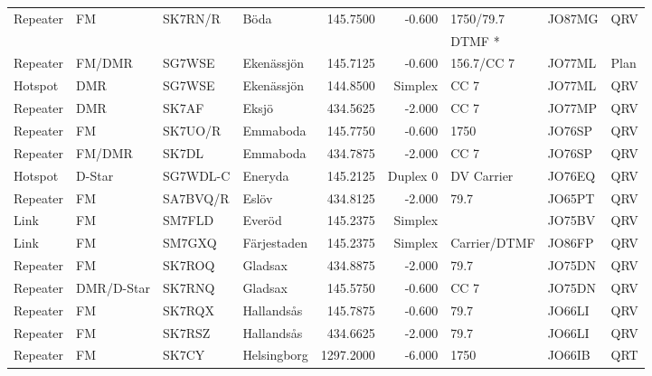 \begin{landscape}
\begin{longtable}{llllrrlll}
Repeater & FM              & SK7RN/R  & Böda         & 145.7500     & -0.600     & 1750/79.7    & JO87MG      & QRV      \\
         &                 &          &              &              &            & DTMF *       &             &          \\
Repeater & FM/DMR          & SG7WSE   & Ekenässjön   & 145.7125     & -0.600     & 156.7/CC 7   & JO77ML      & Plan     \\
Hotspot  & DMR             & SG7WSE   & Ekenässjön   & 144.8500     & Simplex    & CC 7         & JO77ML      & QRV      \\
Repeater & DMR             & SK7AF    & Eksjö        & 434.5625     & -2.000     & CC 7         & JO77MP      & QRV      \\
Repeater & FM              & SK7UO/R  & Emmaboda     & 145.7750     & -0.600     & 1750         & JO76SP      & QRV      \\
Repeater & FM/DMR          & SK7DL    & Emmaboda     & 434.7875     & -2.000     & CC 7         & JO76SP      & QRV      \\
Hotspot  & D-Star          & SG7WDL-C & Eneryda      & 145.2125     & Duplex 0   & DV Carrier   & JO76EQ      & QRV      \\
Repeater & FM              & SA7BVQ/R & Eslöv        & 434.8125     & -2.000     & 79.7         & JO65PT      & QRV      \\
Link     & FM              & SM7FLD   & Everöd       & 145.2375     & Simplex    &              & JO75BV      & QRV      \\
Link     & FM              & SM7GXQ   & Färjestaden  & 145.2375     & Simplex    & Carrier/DTMF & JO86FP      & QRV      \\
Repeater & FM              & SK7ROQ   & Gladsax      & 434.8875     & -2.000     & 79.7         & JO75DN      & QRV      \\
Repeater & DMR/D-Star      & SK7RNQ   & Gladsax      & 145.5750     & -0.600     & CC 7         & JO75DN      & QRV      \\
Repeater & FM              & SK7RQX   & Hallandsås   & 145.7875     & -0.600     & 79.7         & JO66LI      & QRV      \\
Repeater & FM              & SK7RSZ   & Hallandsås   & 434.6625     & -2.000     & 79.7         & JO66LI      & QRV      \\
Repeater & FM              & SK7CY    & Helsingborg  & 1297.2000    & -6.000     & 1750         & JO66IB      & QRT      \\

\end{longtable}
\end{landscape}
